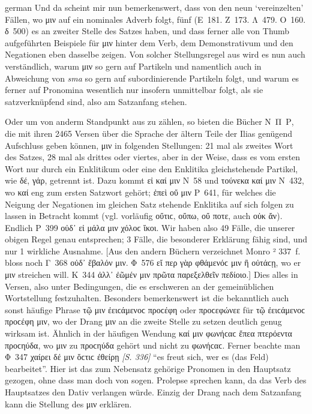 \begin{otherlanguage*}{german}
\largerpage
Und da scheint mir nun bemerkenswert, dass von den neun ‘vereinzelten’ Fällen, wo μιν auf ein nominales Adverb folgt, fünf (Ε~181. Ζ~173. Λ~479. Ο~160. δ~500) es an zweiter Stelle des Satzes haben, und dass ferner alle von Thumb aufgeführten Beispiele für μιν hinter dem Verb, dem Demonstrativum und den Negationen eben dasselbe zeigen. Von solcher Stellungsregel aus wird es nun auch verständlich, warum μιν so gern auf Partikeln und namentlich auch in Abweichung von \emph{sma} so gern auf subordinierende Partikeln folgt, und warum es ferner auf Pronomina wesentlich nur insofern unmittelbar folgt, als sie satzverknüpfend sind, also am Satzanfang stehen.

Oder um von anderm Standpunkt aus zu zählen, so bieten die Bücher Ν~Π~Ρ, die mit ihren 2465 Versen über die Sprache der ältern Teile der Ilias genügend Aufschluss geben können, μιν in folgenden Stellungen: 21 mal als zweites Wort des Satzes, 28 mal als drittes oder viertes, aber in der Weise, dass es vom ersten Wort nur durch ein Enklitikum oder eine den Enklitika gleichstehende Partikel, wie δέ, γάρ, getrennt ist. Dazu kommt εἰ καί μιν Ν~58 und τούνεκα καί μιν Ν~432, wo καί eng zum ersten Satzwort gehört; ἐπεὶ οὔ μιν Ρ~641, für welches die Neigung der Negationen im gleichen Satz stehende Enklitika auf sich folgen zu lassen in Betracht kommt (vgl. vorläufig οὔτιϲ, οὔπω, οὔ ποτε, auch οὐκ ἄν). Endlich Ρ~399 οὐδ᾽ εἰ μάλα μιν χόλοϲ ἵκοι. Wir haben also 49 Fälle, die unserer obigen Regel genau entsprechen; 3 Fälle, die besonderer Erklärung fähig sind, und nur 1 wirkliche Ausnahme. [Aus den andern Büchern verzeichnet Monro ² 337~f. bloss noch Γ~368 οὐδ᾽ ἔβαλόν μιν. Φ~576 εἴ περ γὰρ φθάμενόϲ μιν ἢ οὐτάϲῃ, wo er μιν streichen will. Κ~344 ἀλλ᾽ ἐῶμέν μιν πρῶτα παρεξελθεῖν πεδίοιο.] Dies alles in Versen, also unter Bedingungen, die es erschweren an der gemeinüblichen Wortstellung festzuhalten. Besonders bemerkenswert ist die bekanntlich auch sonst häufige Phrase τῷ μιν ἐειϲάμενοϲ προϲέφη oder προϲεφώνεε für τῷ ἐειϲάμενοϲ προϲέφη μιν, wo der Drang μιν an die zweite Stelle zu setzen deutlich genug wirksam ist. Ähnlich in der häufigen Wendung καί μιν φωνήϲαϲ ἔπεα πτερόεντα προϲηύδα, wo μιν zu προϲηύδα gehört und nicht zu φωνήϲαϲ. Ferner beachte man Φ~347 χαίρει δέ μιν ὅϲτιϲ ἐθείρῃ \hypertarget{p336}{\emph{[S. 336]}}\label{p336} “es freut sich, wer es (das Feld) bearbeitet”. Hier ist das zum Nebensatz gehörige Pronomen in den Hauptsatz gezogen, ohne dass man doch von sogen. Prolepse sprechen kann, da das Verb des Hauptsatzes den Dativ verlangen würde. Einzig der Drang nach dem Satzanfang kann die Stellung des μιν erklären.


\end{otherlanguage*}
